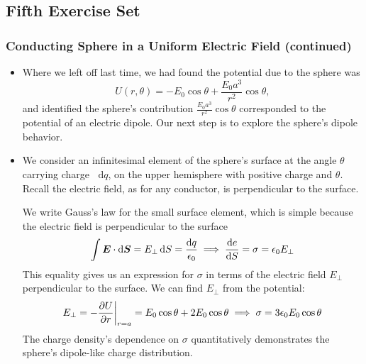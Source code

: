 \documentclass[11pt, a4paper]{article}
\newcommand{\diff}{\mathop{}\!\mathrm{d}} %
\renewcommand{\vec}[1]{\bm{#1}} %
\newcommand{\e}{\epsilon_{0}} %
\begin{document}
\subsection{Fifth Exercise Set}

\subsubsection{Conducting Sphere in a Uniform Electric Field (continued)}
\begin{itemize}
	\item Where we left off last time, we had found the potential due to the sphere was
	\begin{equation*}
		U(r, \theta) = - E_{0} \cos \theta + \frac{E_{0}a^{3}}{r^{2}}\cos \theta,
	\end{equation*}
	and identified the sphere's contribution $ \frac{E_{0}a^{3}}{r^{2}}\cos \theta $ corresponded to the potential of an electric dipole. Our next step is to explore the sphere's dipole behavior.
	
	\item We consider an infinitesimal element of the sphere's surface at the angle $ \theta $ carrying charge $ \diff q $, on the upper hemisphere with positive charge and $ \theta $. Recall the electric field, as for any conductor, is perpendicular to the surface. 
	
	We write Gauss's law for the small surface element, which is simple because the electric field is perpendicular to the surface
	\begin{equation*}
		\int \vec{E} \cdot \diff \vec{S} = E_{\perp} \diff S = \frac{\diff q}{\e} \implies \dv{e}{S} = \sigma = \e E_{\perp}
	\end{equation*}
	This equality gives us an expression for $ \sigma $ in terms of the electric field $ E_{\perp} $ perpendicular to the surface. We can find $ E_{\perp} $ from the potential:
	\begin{equation*}
		E_{\perp} = -\pdv{U}{r}\bigg |_{r = a} = E_{0}\cos \theta + 2E_{0}\cos \theta \implies \sigma = 3\e E_{0} \cos \theta
	\end{equation*}
	The charge density's dependence on $ \sigma $ quantitatively demonstrates the sphere's dipole-like charge distribution. 
	

\end{itemize}
\end{document}
